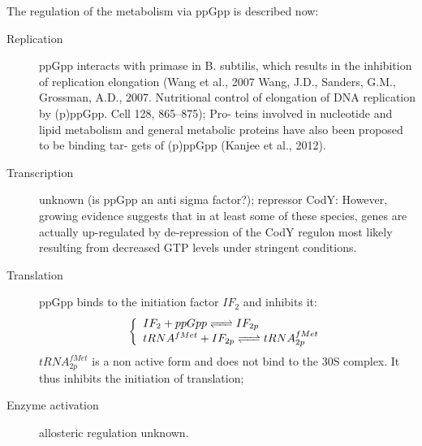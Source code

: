 The regulation of the metabolism via ppGpp is described now:
\begin{description}
  \item[Replication] ppGpp interacts with primase
in
B.
subtilis,
which
results
in
the
inhibition
of
replication
elongation (Wang et al., 2007 Wang,
J.D.,
Sanders,
G.M.,
Grossman,
A.D.,
2007.
Nutritional
control
of
elongation
of
DNA
replication
by
(p)ppGpp.
Cell
128,
865–875); Pro-
teins involved in nucleotide and lipid metabolism and general
metabolic proteins have also been proposed to be binding tar-
gets of (p)ppGpp (Kanjee et al., 2012).
  \item[Transcription] unknown (is ppGpp an anti sigma factor?); repressor CodY:  However, growing evidence suggests that in at least some
of these species, genes are actually up-regulated by de-repression
of the CodY regulon most likely resulting from decreased GTP levels
under stringent conditions.
  \item[Translation] ppGpp binds to the initiation factor $IF_2$ and inhibits it:
    $$
      \left\{
        \begin{array}{l}
          \reactionRev{IF_2+ppGpp}{IF_{2p}}{}{} \\
          \reactionRev{tRNA^{fMet}+IF_{2p}}{tRNA_{2p}^{fMet}}{}{} \\
        \end{array}
      \right.
    $$
    $tRNA_{2p}^{fMet}$ is a non active form and does not bind to the 30S complex. It thus inhibits the initiation of translation;
  \item[Enzyme activation] allosteric regulation unknown.
\end{description}

